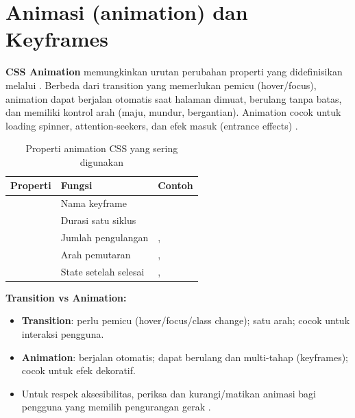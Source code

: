 \section{Animasi (animation) dan Keyframes}

\textbf{CSS Animation} memungkinkan urutan perubahan properti yang didefinisikan melalui . Berbeda dari transition yang memerlukan pemicu (hover/focus), animation dapat berjalan otomatis saat halaman dimuat, berulang tanpa batas, dan memiliki kontrol arah (maju, mundur, bergantian). Animation cocok untuk loading spinner, attention-seekers, dan efek masuk (entrance effects) \cite{mdnCss}.


\begin{table}[htbp]
\centering
\begin{tabular}{|P{5cm}|P{3.5cm}|P{3.5cm}|}
\hline
\textbf{Properti} & \textbf{Fungsi} & \textbf{Contoh} \\
\hline
{} & Nama keyframe &  \\
\hline
{} & Durasi satu siklus &  \\
\hline
{} & Jumlah pengulangan & ,  \\
\hline
{} & Arah pemutaran & ,  \\
\hline
{} & State setelah selesai & ,  \\
\hline
\end{tabular}
\caption{Properti animation CSS yang sering digunakan}
\end{table}

\begin{catatan}
\textbf{Transition vs Animation:}
\begin{itemize}
  \item \textbf{Transition}: perlu pemicu (hover/focus/class change); satu arah; cocok untuk interaksi pengguna.
  \item \textbf{Animation}: berjalan otomatis; dapat berulang dan multi-tahap (keyframes); cocok untuk efek dekoratif.
  \item Untuk respek aksesibilitas, periksa  dan kurangi/matikan animasi bagi pengguna yang memilih pengurangan gerak \cite{mdnAccessibility}.
\end{itemize}
\end{catatan}

